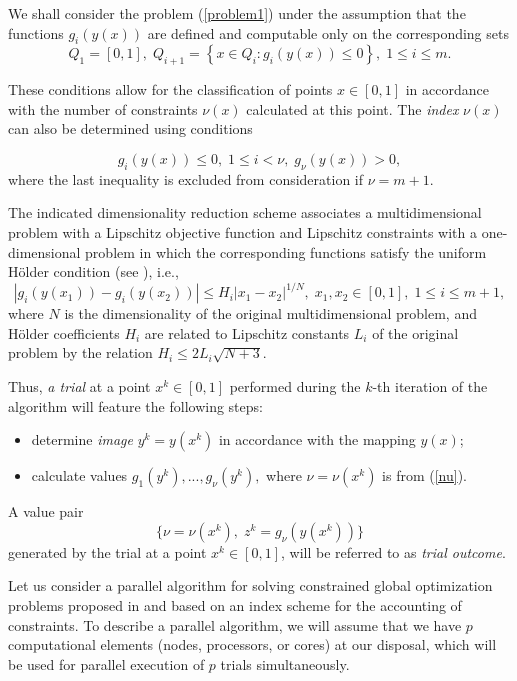 \documentclass[
11pt,%
tightenlines,%
twoside,%
onecolumn,%
nofloats,%
nobibnotes,%
nofootinbib,%
superscriptaddress,%
noshowpacs,%
centertags]%
{revtex4}
\begin{document}
We shall consider the problem (\ref{problem1}) under the assumption that the functions $g_i(y(x))$ are defined and computable only on the corresponding sets
\[
Q_1=[0,1], \; Q_{i+1}=\left\{x \in Q_i : g_i(y(x)) \leq 0 \right\}, \; 1 \leq i \leq m.
\]

These conditions allow for the classification of points $x \in [0,1]$ in accordance with the number of constraints $\nu(x)$  calculated at this point. The \textit{index} $\nu(x)$ can also be determined using conditions

\begin{equation}\label{nu}
g_i(y(x)) \leq 0, \; 1 \leq i < \nu, \; g_\nu(y(x))>0,
\end{equation}
where the last inequality is excluded from consideration if  $\nu=m+1$.

The indicated dimensionality reduction scheme associates a multidimensional problem with a Lipschitz objective function and Lipschitz constraints with a one-dimensional problem in which the corresponding functions satisfy the uniform  H{\"o}lder condition (see \cite{Sergeyev2013}), i.e.,
\[
\left|g_i(y(x_1))-g_i (y(x_2))\right| \leq H_i \left|x_1-x_2 \right|^{1/N}, \; x_1,x_2\in [0,1], \; 1\leq i \leq m+1,
\]
where $N$ is the dimensionality of the original multidimensional problem, and H{\"o}lder coefficients $H_i$ are related to Lipschitz constants $L_i$ of the original problem by the relation  $H_i \leq 2L_i \sqrt{N+3}$.

Thus, \textit{a trial} at a point $x^k \in [0,1]$ performed during the $k$-th iteration of the algorithm will feature the following steps:
\begin{itemize}
	\item determine \textit{image} $y^k=y(x^k)$ in accordance with the mapping $y(x)$;
	\item calculate values $g_1(y^k),..., g_\nu(y^k),$ where $\nu = \nu(x^k)$ is from (\ref{nu}). 
\end{itemize}
A value pair
\begin{equation} \label{trial_result}
 \{ \nu=\nu(x^k), \; z^k=g_\nu(y(x^k)) \} 
\end{equation}
generated by the trial at a point $x^k \in [0,1]$, will be referred to as \textit{trial outcome}.

Let us consider a parallel algorithm for solving constrained global optimization problems proposed in  \cite{Strongin2000,Strongin2013} and based on an index scheme for the accounting of constraints.
To describe a parallel algorithm, we will assume that we have $p$ computational elements (nodes, processors, or cores) at our disposal, which will be used for parallel execution of $p$ trials simultaneously. 
\end{document}
